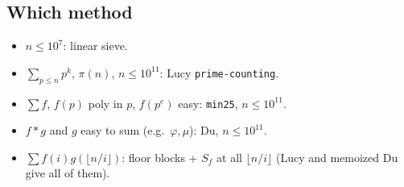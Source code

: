 \subsection{Which method}
\begin{itemize}
\item $n\le10^7$: linear sieve.
\item $\sum_{p\le n}p^k$, $\pi(n)$, $n\le10^{11}$: Lucy \texttt{prime-counting}.
\item $\sum f$, $f(p)$ poly in $p$, $f(p^e)$ easy: \texttt{min25}, $n\le10^{11}$.
\item $f*g$ and $g$ easy to sum (e.g.\ $\varphi,\mu$): Du, $n\le10^{11}$.
\item $\sum f(i)g(\lfloor n/i\rfloor)$: floor blocks + $S_f$ at all $\lfloor n/i\rfloor$
(Lucy and memoized Du give all of them).
\end{itemize}
